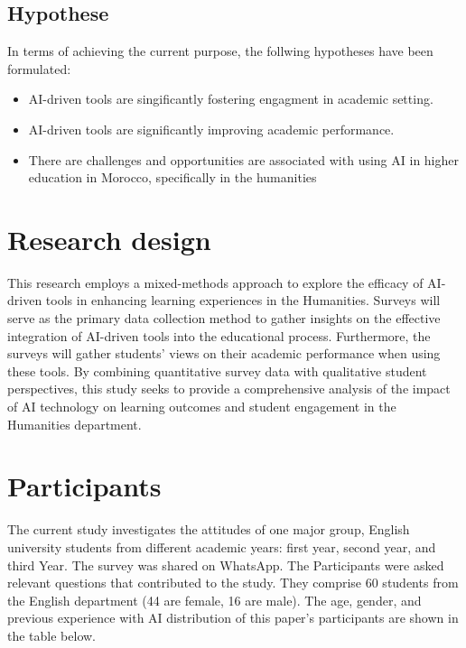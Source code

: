 \subsection{Hypothese}
In terms of achieving the current purpose, the follwing hypotheses have been formulated:
\begin{itemize}
	\item AI-driven tools are singificantly fostering engagment in academic setting.
	\item AI-driven tools are significantly improving academic performance.
	\item There are challenges and opportunities are associated with using AI in higher education
	      in Morocco, specifically in the humanities
\end{itemize}

\section{Research design}
This research employs a mixed-methods approach to explore the efficacy of AI-driven
tools in enhancing learning experiences in the Humanities. Surveys will serve as the
primary data collection method to gather insights on the effective integration of AI-driven
tools into the educational process. Furthermore, the surveys will gather students' views on
their academic performance when using these tools. By combining quantitative survey data with
qualitative student perspectives, this study seeks to provide a comprehensive analysis of the
impact of AI technology on learning outcomes and student engagement in the Humanities department.

\section{Participants}
The current study investigates the attitudes of one major group, English university students
from different academic years: first year, second year, and third Year. The survey was
shared on WhatsApp. The Participants were asked relevant questions that contributed to the study.
They comprise 60 students from the English department (44 are female, 16 are male).
The age, gender, and previous experience with AI distribution of this paper’s
participants are shown in the table below.

